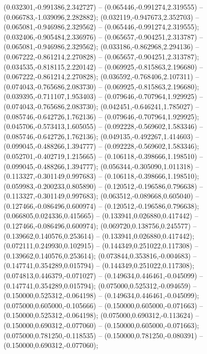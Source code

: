  (0.032301,-0.991386,2.342727) -- (0.065446,-0.991274,2.319555) -- (0.066783,-1.039096,2.282882);
 (0.032119,-0.947673,2.352703) -- (0.065081,-0.946986,2.329562) -- (0.065446,-0.991274,2.319555);
 (0.032406,-0.905484,2.336976) -- (0.065657,-0.904251,2.313787) -- (0.065081,-0.946986,2.329562);
 (0.033186,-0.862968,2.294136) -- (0.067222,-0.861214,2.270828) -- (0.065657,-0.904251,2.313787);
 (0.034535,-0.818115,2.220142) -- (0.069925,-0.815863,2.196680) -- (0.067222,-0.861214,2.270828);
 (0.036592,-0.768406,2.107311) -- (0.074043,-0.765686,2.083730) -- (0.069925,-0.815863,2.196680);
 (0.039395,-0.711107,1.953403) -- (0.079646,-0.707964,1.929925) -- (0.074043,-0.765686,2.083730);
 (0.042451,-0.646241,1.785027) -- (0.085746,-0.642726,1.762136) -- (0.079646,-0.707964,1.929925);
 (0.045706,-0.573413,1.605055) -- (0.092228,-0.569602,1.583346) -- (0.085746,-0.642726,1.762136);
 (0.049135,-0.492267,1.414603) -- (0.099045,-0.488266,1.394777) -- (0.092228,-0.569602,1.583346);
 (0.052701,-0.402719,1.215665) -- (0.106118,-0.398666,1.198510) -- (0.099045,-0.488266,1.394777);
 (0.056344,-0.305090,1.011318) -- (0.113327,-0.301149,0.997683) -- (0.106118,-0.398666,1.198510);
 (0.059983,-0.200233,0.805890) -- (0.120512,-0.196586,0.796638) -- (0.113327,-0.301149,0.997683);
 (0.063512,-0.089668,0.605040) -- (0.127466,-0.086496,0.600974) -- (0.120512,-0.196586,0.796638);
 (0.066805,0.024336,0.415665) -- (0.133941,0.026880,0.417442) -- (0.127466,-0.086496,0.600974);
 (0.069720,0.138756,0.245577) -- (0.139662,0.140576,0.253614) -- (0.133941,0.026880,0.417442);
 (0.072111,0.249930,0.102915) -- (0.144349,0.251022,0.117308) -- (0.139662,0.140576,0.253614);
 (0.073844,0.353816,-0.004683) -- (0.147741,0.354289,0.015794) -- (0.144349,0.251022,0.117308);
 (0.074813,0.446379,-0.071027) -- (0.149634,0.446461,-0.045099) -- (0.147741,0.354289,0.015794);
 (0.075000,0.525312,-0.094659) -- (0.150000,0.525312,-0.064198) -- (0.149634,0.446461,-0.045099);
 (0.075000,0.605000,-0.105666) -- (0.150000,0.605000,-0.071663) -- (0.150000,0.525312,-0.064198);
 (0.075000,0.690312,-0.113624) -- (0.150000,0.690312,-0.077060) -- (0.150000,0.605000,-0.071663);
 (0.075000,0.781250,-0.118535) -- (0.150000,0.781250,-0.080391) -- (0.150000,0.690312,-0.077060);

